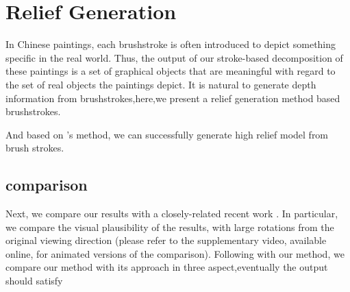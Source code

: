
\section{ Relief Generation}

In Chinese paintings, each brushstroke is often introduced to depict something specific in the real world.
Thus, the output of our stroke-based decomposition of these paintings is a set of graphical objects that are meaningful with regard to the set of real objects the paintings depict. It is natural to generate depth information from brushstrokes,here,we present a relief generation method based brushstrokes. \cite{xu2006animating}

And based on \cite{yeh2017interactive}'s method, we can successfully generate high relief model from brush strokes. 

\subsection{comparison}
Next, we compare our results with a closely-related recent work \cite{yeh2017interactive}. In particular, we compare the visual plausibility of the results, with large rotations from the original viewing direction (please refer to the supplementary video, available online, for animated versions of the comparison). 
Following with our method, we compare our method with its approach in three aspect,eventually the output should satisfy 


